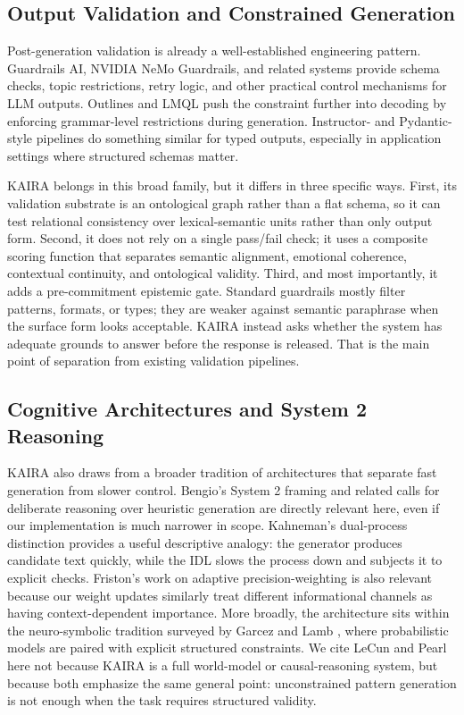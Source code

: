 \documentclass[11pt,a4paper]{article}
\begin{document}
\subsection{Output Validation and Constrained Generation}
Post-generation validation is already a well-established engineering pattern. Guardrails AI, NVIDIA NeMo Guardrails, and related systems provide schema checks, topic restrictions, retry logic, and other practical control mechanisms for LLM outputs. Outlines and LMQL push the constraint further into decoding by enforcing grammar-level restrictions during generation. Instructor- and Pydantic-style pipelines do something similar for typed outputs, especially in application settings where structured schemas matter.

KAIRA belongs in this broad family, but it differs in three specific ways. First, its validation substrate is an ontological graph rather than a flat schema, so it can test relational consistency over lexical-semantic units rather than only output form. Second, it does not rely on a single pass/fail check; it uses a composite scoring function that separates semantic alignment, emotional coherence, contextual continuity, and ontological validity. Third, and most importantly, it adds a pre-commitment epistemic gate. Standard guardrails mostly filter patterns, formats, or types; they are weaker against semantic paraphrase when the surface form looks acceptable. KAIRA instead asks whether the system has adequate grounds to answer before the response is released. That is the main point of separation from existing validation pipelines.

\subsection{Cognitive Architectures and System 2 Reasoning}
KAIRA also draws from a broader tradition of architectures that separate fast generation from slower control. Bengio's System 2 framing and related calls for deliberate reasoning over heuristic generation are directly relevant here, even if our implementation is much narrower in scope. Kahneman's dual-process distinction \cite{kahneman2011} provides a useful descriptive analogy: the generator produces candidate text quickly, while the IDL slows the process down and subjects it to explicit checks. Friston's work on adaptive precision-weighting \cite{friston2010} is also relevant because our weight updates similarly treat different informational channels as having context-dependent importance. More broadly, the architecture sits within the neuro-symbolic tradition surveyed by Garcez and Lamb \cite{garcez2023}, where probabilistic models are paired with explicit structured constraints. We cite LeCun \cite{lecun2022} and Pearl \cite{pearl2009} here not because KAIRA is a full world-model or causal-reasoning system, but because both emphasize the same general point: unconstrained pattern generation is not enough when the task requires structured validity.
\end{document}
